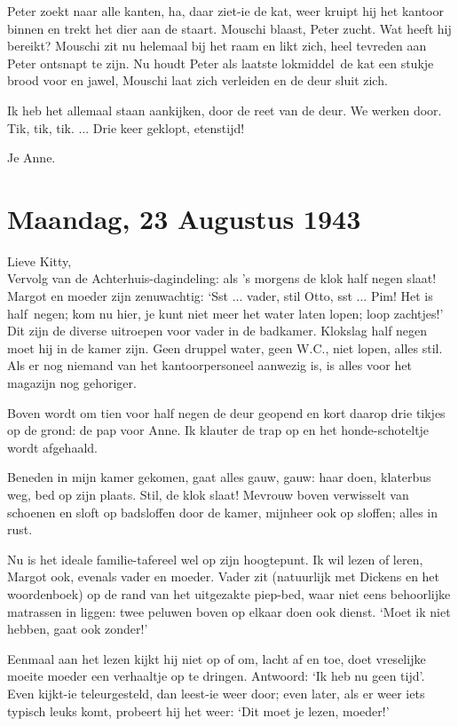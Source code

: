 \documentclass{book}
\begin{document}
Peter zoekt naar alle kanten, ha, daar ziet-ie de kat, weer kruipt hij het
kantoor binnen en trekt het dier aan de staart. Mouschi blaast, Peter zucht. Wat
heeft hij bereikt? Mouschi zit nu helemaal bij het raam en likt zich, heel
tevreden aan Peter ontsnapt te zijn. Nu houdt Peter als laatste lokmiddel~de kat
een stukje brood voor en jawel, Mouschi laat zich verleiden en de deur sluit
zich.

Ik heb het allemaal staan aankijken, door de reet van de deur. We werken door.
Tik, tik, tik. ... Drie keer geklopt, etenstijd!

Je Anne.

\section*{Maandag, 23 Augustus 1943}

Lieve Kitty,\\
Vervolg van de Achterhuis-dagindeling: als 's morgens de klok
half negen slaat! Margot en moeder zijn zenuwachtig: `Sst ...  vader, stil Otto,
sst ... Pim! Het is half~negen; kom nu hier, je kunt niet meer het water laten
lopen; loop zachtjes!' Dit zijn de diverse uitroepen voor vader in de badkamer.
Klokslag half negen moet hij in de kamer zijn. Geen druppel water, geen W.C.,
niet lopen, alles stil. Als er nog niemand van het kantoorpersoneel aanwezig is,
is alles voor het magazijn nog gehoriger.

Boven wordt om tien voor half negen de deur geopend en kort daarop drie tikjes
op de grond: de pap voor Anne. Ik klauter de trap op en het honde-schoteltje
wordt afgehaald.

Beneden in mijn kamer gekomen, gaat alles gauw, gauw: haar doen, klaterbus weg,
bed op zijn plaats. Stil, de klok slaat! Mevrouw boven verwisselt van schoenen
en sloft op badsloffen door de kamer, mijnheer ook op sloffen; alles in rust.

Nu is het ideale familie-tafereel wel op zijn hoogtepunt. Ik wil lezen of leren,
Margot ook, evenals vader en moeder. Vader zit (natuurlijk met Dickens en het
woordenboek) op de rand van het uitgezakte piep-bed, waar niet eens behoorlijke
matrassen in liggen: twee peluwen boven op elkaar doen ook dienst. `Moet ik niet
hebben, gaat ook zonder!'

Eenmaal aan het lezen kijkt hij niet op of om, lacht af en toe, doet vreselijke
moeite moeder een verhaaltje op te dringen. Antwoord: `Ik heb nu geen tijd'.
Even kijkt-ie teleurgesteld, dan leest-ie weer door; even later, als er weer
iets typisch leuks komt, probeert hij het weer: `Dit moet je lezen, moeder!'
\end{document}
